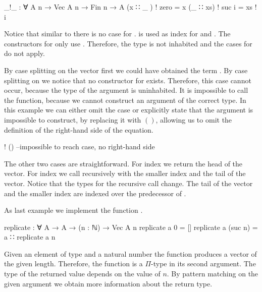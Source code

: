 \begin{AgdaAlign}
\begin{code}
_!_ : ∀ {A n} → Vec A n → Fin n → A
(x  ∷ _ )  ! zero   = x
(_  ∷ xs)  ! suc i  = xs ! i
\end{code}
Notice that similar to  there is no case for
\AgdaInductiveConstructor{[]}.
 is used as index for
\AgdaSpace{} and .
The constructors for  only use .
Therefore, the type
\AgdaSpace{}
is not inhabited and the cases for \AgdaInductiveConstructor{[]} do not apply.

By case splitting on the vector first we could have obtained the term
\AgdaInductiveConstructor{[]}\AgdaSpace{}\AgdaFunction{!}\AgdaSpace{}.
By case splitting on  we notice that no constructor for
 exists.
Therefore, this case cannot occur, because the type of the argument is
uninhabited.
It is impossible to call the function, because we cannot construct an argument of
the correct type.
In this example we can either omit the case or explicitly state that the
argument is impossible to construct, by replacing it with $()$, allowing us to
omit the definition of the right-hand side of the equation.

\begin{code}
[]         ! () --impossible to reach case, no right-hand side
\end{code}
\end{AgdaAlign}
The other two cases are straightforward.
For index  we return the head of the vector.
For index \AgdaSpace{} we call
\AgdaFunction{\_!\_} recursively with the smaller index and the tail of the
vector.
Notice that the types for the recursive call change.
The tail of the vector  and the smaller index 
are indexed over the predecessor of .

As last example we implement the function .
\begin{code}
replicate : ∀ {A} → A → (n : ℕ) → Vec A n
replicate a 0        = []
replicate a (suc n)  = a ∷ replicate a n
\end{code}
Given an element of type  and a natural number 
the function produces a vector of the given length.
Therefore, the function is a $\Pi$-type in its second argument.
The type of the returned value depends on the value of $n$.
By pattern matching on the given argument we obtain more information about the
return type.

